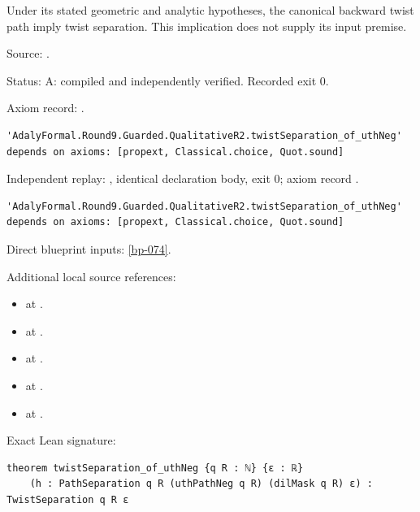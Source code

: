 \begin{theorem}[bp-293]
\label{bp-293}
\leanok
Under its stated geometric and analytic hypotheses, the canonical backward twist path imply twist separation. This implication does not supply its input premise.

\par Source: \texttt{}.
\par Status: A: compiled and independently verified. Recorded exit 0.
\par Axiom record: \texttt{}.
\begin{verbatim}
'AdalyFormal.Round9.Guarded.QualitativeR2.twistSeparation_of_uthNeg' depends on axioms: [propext, Classical.choice, Quot.sound]
\end{verbatim}
\par Independent replay: \texttt{}, identical declaration body, exit 0; axiom record \texttt{}.
\begin{verbatim}
'AdalyFormal.Round9.Guarded.QualitativeR2.twistSeparation_of_uthNeg' depends on axioms: [propext, Classical.choice, Quot.sound]
\end{verbatim}
\par Direct blueprint inputs: \ref{bp-074}.
\par Additional local source references:
\begin{itemize}
\item \texttt{} at \texttt{}.
\item \texttt{} at \texttt{}.
\item \texttt{} at \texttt{}.
\item \texttt{} at \texttt{}.
\item \texttt{} at \texttt{}.
\end{itemize}
\par Exact Lean signature:
\begin{verbatim}
theorem twistSeparation_of_uthNeg {q R : ℕ} {ε : ℝ}
    (h : PathSeparation q R (uthPathNeg q R) (dilMask q R) ε) : TwistSeparation q R ε
\end{verbatim}
\end{theorem}


